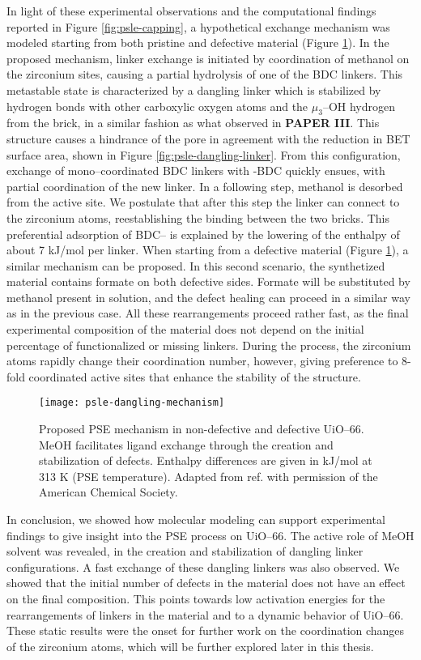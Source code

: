 In light of these experimental observations and the computational findings reported in Figure \ref{fig:psle-capping}, a hypothetical exchange mechanism was modeled starting from both pristine and defective material (Figure \ref{fig:psle-dangling-mechanism}). In the proposed mechanism, linker exchange is initiated by coordination of methanol on the zirconium sites, causing a partial hydrolysis of one of the BDC linkers. This metastable state is characterized by a dangling linker which is stabilized by hydrogen bonds with other carboxylic oxygen atoms and the $\mu_3$--OH hydrogen from the brick, in a similar fashion as what observed in \textbf{PAPER III}. This structure causes a hindrance of the pore in agreement with the reduction in BET surface area, shown in Figure \ref{fig:psle-dangling-linker}. From this configuration, exchange of mono--coordinated BDC linkers with -BDC quickly ensues, with partial coordination of the new linker. In a following step, methanol is desorbed from the active site. We postulate that after this step the linker can connect to the zirconium atoms, reestablishing the binding between the two bricks. This preferential adsorption of BDC-- is explained by the lowering of the enthalpy of about 7 kJ/mol per linker. When starting from a defective material (Figure \ref{fig:psle-dangling-mechanism}), a similar mechanism can be proposed. In this second scenario, the synthetized material contains formate on both defective sides. Formate will be substituted by methanol present in solution, and the defect healing can proceed in a similar way as in the previous case. All these rearrangements proceed rather fast, as the final experimental composition of the material does not depend on the initial percentage of functionalized or missing linkers. During the process, the zirconium atoms rapidly change their coordination number, however, giving preference to 8-fold coordinated active sites that enhance the stability of the structure. 
\begin{figure}[!htbp]
	\centering
	\texttt{[image: psle-dangling-mechanism]}
	\caption{Proposed PSE mechanism in non-defective and defective UiO--66. MeOH facilitates ligand exchange through the creation and stabilization of defects. Enthalpy differences are given in kJ/mol at 313 K (PSE temperature). Adapted from ref. \cite{marreiros2019active} with permission of the American Chemical Society.}
	\label{fig:psle-dangling-mechanism}
\end{figure}
\npar
In conclusion, we showed how molecular modeling can support experimental findings to give insight into the PSE process on UiO--66. The active role of MeOH solvent was revealed, in the creation and stabilization of dangling linker configurations. A fast exchange of these dangling linkers was also observed. We showed that the initial number of defects in the material does not have an effect on the final composition. This points towards low activation energies for the rearrangements of linkers in the material and to a dynamic behavior of UiO--66. These static results were the onset for further work on the coordination changes of the zirconium atoms, which will be further explored later in this thesis.

